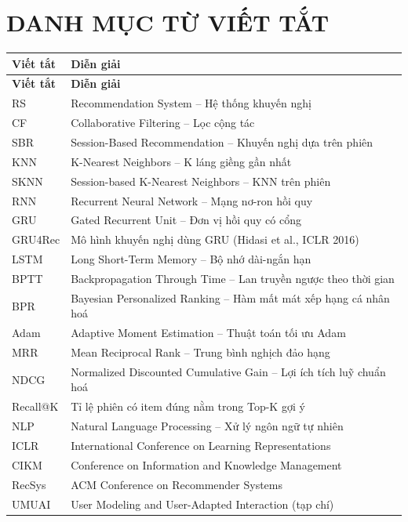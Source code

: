 \documentclass[12pt, a4paper]{article}
\begin{document}
\newpage
{}
{}
\section*{DANH MỤC TỪ VIẾT TẮT}

\begin{longtable}{@{}p{2.8cm} p{12.5cm}@{}}
\toprule
\textbf{Viết tắt} & \textbf{Diễn giải} \\
\midrule
\endfirsthead
\toprule
\textbf{Viết tắt} & \textbf{Diễn giải} \\
\midrule
\endhead
\bottomrule
\endfoot

RS       & Recommendation System -- Hệ thống khuyến nghị \\
CF       & Collaborative Filtering -- Lọc cộng tác \\
SBR      & Session-Based Recommendation -- Khuyến nghị dựa trên phiên \\
KNN      & K-Nearest Neighbors -- K láng giềng gần nhất \\
SKNN     & Session-based K-Nearest Neighbors -- KNN trên phiên \\
RNN      & Recurrent Neural Network -- Mạng nơ-ron hồi quy \\
GRU      & Gated Recurrent Unit -- Đơn vị hồi quy có cổng \\
GRU4Rec  & Mô hình khuyến nghị dùng GRU (Hidasi et al., ICLR 2016) \\
LSTM     & Long Short-Term Memory -- Bộ nhớ dài-ngắn hạn \\
BPTT     & Backpropagation Through Time -- Lan truyền ngược theo thời gian \\
BPR      & Bayesian Personalized Ranking -- Hàm mất mát xếp hạng cá nhân hoá \\
Adam     & Adaptive Moment Estimation -- Thuật toán tối ưu Adam \\
MRR      & Mean Reciprocal Rank -- Trung bình nghịch đảo hạng \\
NDCG     & Normalized Discounted Cumulative Gain -- Lợi ích tích luỹ chuẩn hoá \\
Recall@K & Tỉ lệ phiên có item đúng nằm trong Top-K gợi ý \\
NLP      & Natural Language Processing -- Xử lý ngôn ngữ tự nhiên \\
ICLR     & International Conference on Learning Representations \\
CIKM     & Conference on Information and Knowledge Management \\
RecSys   & ACM Conference on Recommender Systems \\
UMUAI    & User Modeling and User-Adapted Interaction (tạp chí) \\

\end{longtable}
\end{document}
